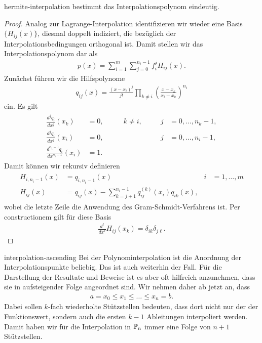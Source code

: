 \begin{Satz}{hermite-interpolation}
   bestimmt das
  Interpolationspolynom eindeutig.
\end{Satz}

\begin{proof}
  Analog zur Lagrange-Interpolation identifizieren wir wieder eine
  Basis $\{H_{ij}(x)\}$, diesmal doppelt indiziert, die bezüglich der
  Interpolationsbedingungen orthogonal ist. Damit stellen wir das
  Interpolationspolynom dar als
  \begin{gather}
    p(x) = \sum_{i=1}^m \sum_{j=0}^{n_i-1} f_i^j H_{ij}(x).
  \end{gather}
  Zunächst führen wir die Hilfspolynome
  \begin{gather}
    q_{ij}(x) = \frac{(x-x_i)^j}{j!}\prod_{k\neq i}
    \left(\frac{x-x_k}{x_i-x_k}\right)^{n_i}
  \end{gather}
  ein. Es gilt
  \begin{gather}
    \begin{aligned}
      \frac{d^j q_i}{d x^j} (x_k) &=0,
      \quad &k\neq i,&\quad& j&=0,\dots,n_{k}-1,\\
      \frac{d^j q_i}{d x^j} (x_i) &=0,
      \qquad &&& j&=0,\dots,n_{i}-1,\\   
      \frac{d^{n_{i}-1} q_i}{d x^{n_{i}-1}} (x_i) &=1.
      \qquad &&&& 
    \end{aligned}
  \end{gather}
  Damit können wir rekursiv definieren
  \begin{gather}
    \begin{aligned}
      H_{i,n_i-1}(x) &= q_{i,n_i-1}(x)
      & i&= 1,\dots,m\\
      H_{ij}(x) &= q_{ij}(x) - \sum_{k=j+1}^{n_i-1} q_{ij}^{(k)}(x_i) q_{ik}(x),
    \end{aligned}
  \end{gather}
  wobei die letzte Zeile die Anwendung des Gram-Schmidt-Verfahrens
  ist. Per constructionem gilt für diese Basis
  \begin{gather}
    \frac{d^\ell}{dx^\ell} H_{ij}(x_k) = \delta_{ik}\delta_{j\ell}.
  \end{gather}
\end{proof}

\begin{Notation}{interpolation-ascending}
  Bei der Polynominterpolation ist die Anordnung der
  Interpolationspunkte beliebig. Das ist auch weiterhin der Fall. Für
  die Darstellung der Resultate und Beweise ist es aber oft hilfreich
  anzunehmen, dass sie in aufsteigender Folge angeordnet sind. Wir
  nehmen daher ab jetzt an, dass
  \begin{gather}
    a = x_0 \le x_1 \le \dots \le x_n = b.
  \end{gather}
  Dabei sollen $k$-fach wiederholte Stützstellen bedeuten, dass dort
  nicht nur der der Funktionswert, sondern auch die ersten $k-1$
  Ableitungen interpoliert werden. Damit haben wir für die
  Interpolation in $\P_n$ immer eine Folge von $n+1$ Stützstellen.
\end{Notation}

